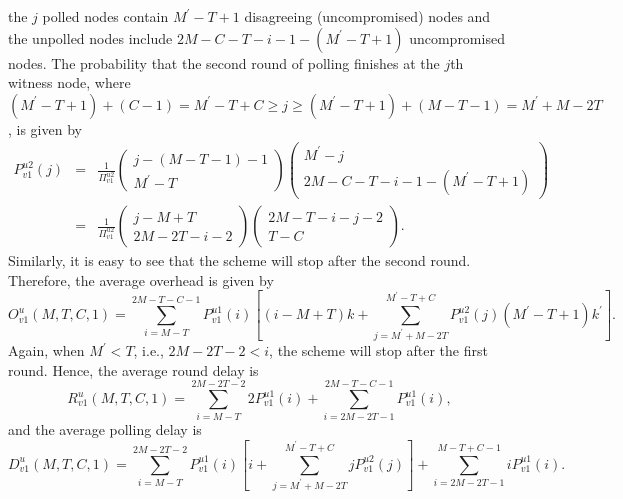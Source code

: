 \documentclass[12pt, onecolumn, draftcls]{IEEEtran}
\begin{document}
the $j$ polled nodes contain $M^{\prime}-T+1$ disagreeing
(uncompromised) nodes and the unpolled nodes include
$2M-C-T-i-1-(M^{\prime}-T+1)$ uncompromised nodes. The probability
that the second round of polling finishes at the $j$th witness node,
where $(M^{\prime}-T+1)+(C-1)=M^{\prime}-T+C \ge j \ge
(M^{\prime}-T+1)+(M-T-1)=M^{\prime}+M-2T$, is given by
\begin{eqnarray*}
P_{v1}^{u2}(j)&=&\frac{1}{\Pi_{v1}^{u2}}\left(\begin{array}{c} j-(M-T-1)-1 \\
M^{\prime}-T
\end{array}\right) \left(\begin{array}{c}  M^{\prime}-j \\
2M-C-T-i-1-(M^{\prime}-T+1)
\end{array}\right) \nonumber \\
&=&\frac{1}{\Pi_{v1}^{u2}}\left(\begin{array}{c} j-M+T \\ 2M-2T-i-2
\end{array}\right) \left(\begin{array}{c}  2M-T-i-j-2 \\ T-C
\end{array}\right).
\end{eqnarray*}
Similarly, it is easy to see that the scheme will stop after the
second round. Therefore, the average overhead is given by
\begin{equation}
O_{v1}^{u}(M,T,C,1) = \sum_{i=M-T}^{2M-T-C-1} P_{v1}^{u1}(i)
\left[(i-M+T)k+ \sum_{j=M^{\prime}+M-2T}^{M^{\prime}-T+C}
P_{v1}^{u2}(j)(M^{\prime}-T+1)k^{\prime} \right].
\label{eqn:polling_invalid_noncompromised_overhead}
\end{equation}
Again, when $M^{\prime}<T$, i.e., $2M-2T-2<i$, the scheme will stop
after the first round. Hence, the average round delay is
\begin{equation}
R_{v1}^u(M,T,C,1) = \sum_{i=M-T}^{2M-2T-2} 2P_{v1}^{u1}(i)
 + \sum_{i=2M-2T-1}^{2M-T-C-1}P_{v1}^{u1}(i),
\label{eqn:polling_invalid_uncompromised_round_delay1}
\end{equation}
and the average polling delay is
\begin{equation}
D_{v1}^u(M,T,C,1) = \sum_{i=M-T}^{2M-2T-2}P_{v1}^{u1}(i)
\left[i+\sum_{j=M^{\prime}+M-2T}^{M^{\prime}-T+C}jP_{v1}^{u2}(j)
\right]
 + \sum_{i=2M-2T-1}^{M-T+C-1}iP_{v1}^{u1}(i).
\label{eqn:polling_invalid_uncompromised_polling_delay1}
\end{equation}
\end{document}

